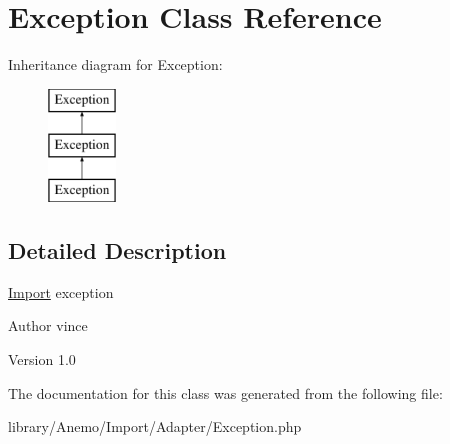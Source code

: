 \hypertarget{class_anemo_1_1_import_1_1_adapter_1_1_exception}{
\section{Exception Class Reference}
\label{class_anemo_1_1_import_1_1_adapter_1_1_exception}
}
Inheritance diagram for Exception:\begin{figure}[H]
\begin{center}
\leavevmode
\includegraphics[height=3.000000cm]{class_anemo_1_1_import_1_1_adapter_1_1_exception}
\end{center}
\end{figure}


\subsection{Detailed Description}
\hyperlink{class_anemo_1_1_import}{Import} exception \begin{DoxyAuthor}{Author}
vince 
\end{DoxyAuthor}
\begin{DoxyVersion}{Version}
1.0 
\end{DoxyVersion}


The documentation for this class was generated from the following file:\begin{DoxyCompactItemize}
\item 
library/Anemo/Import/Adapter/Exception.php\end{DoxyCompactItemize}
